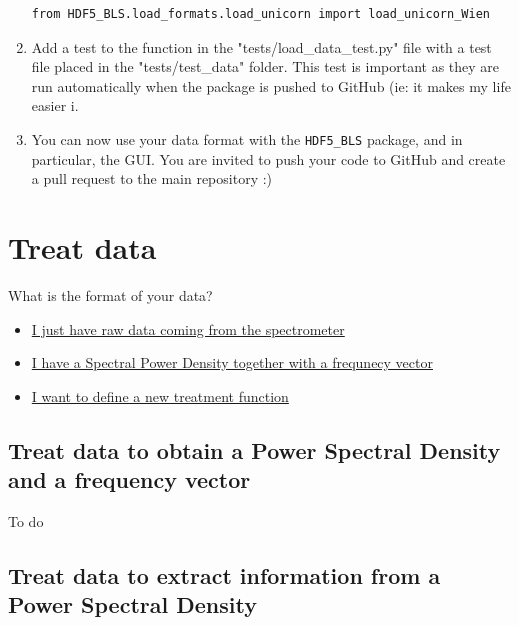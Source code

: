 \documentclass{book}
\begin{document}
\begin{enumerate}
\begin{lstlisting}
from HDF5_BLS.load_formats.load_unicorn import load_unicorn_Wien
\end{lstlisting}
                \item Add a test to the function in the "tests/load\_data\_test.py" file with a test file placed in the "tests/test\_data" folder. This test is important as they are run automatically when the package is pushed to GitHub (ie: it makes my life easier ^^). 
                \item You can now use your data format with the \texttt{HDF5\_BLS} package, and in particular, the GUI. You are invited to push your code to GitHub and create a pull request to the main repository :)
            \end{enumerate}

    \section{Treat data} \label{sec:treatment}

        \begin{tcolorbox}
            What is the format of your data?
            \begin{itemize}
                \item \hyperref[subsec:treatment.toPSD]{I just have raw data coming from the spectrometer}
                \item \hyperref[subsec:treatment.toInfo]{I have a Spectral Power Density together with a frequnecy vector}
                \item \hyperref[subsec:treatment.new]{I want to define a new treatment function}
            \end{itemize}
        \end{tcolorbox}

        \subsection{Treat data to obtain a Power Spectral Density and a frequency vector} \label{subsec:treatment.toPSD}
            \begin{tcolorbox}
                To do
            \end{tcolorbox}

        \subsection{Treat data to extract information from a Power Spectral Density} \label{subsec:treatment.toInfo}
\end{document}
